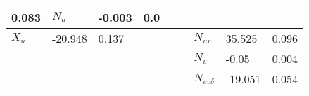 \begin{table}[h]
\begin{tabular}{|T|T|T|T|T|T|T|T|T|}
0.083
&

\( N_{u} \)
&

-0.003
&

0.0
\\
\hline

\( X_{u} \)
&

-20.948
&

0.137
&&&&

\( N_{ur} \)
&

35.525
&

0.096
\\
\hline&&&&&&

\( N_{v} \)
&

-0.05
&

0.004
\\
\hline&&&&&&

\( N_{vv\delta} \)
&

-19.051
&

0.054
\\
\hline
\end{tabular}

\end{table}

